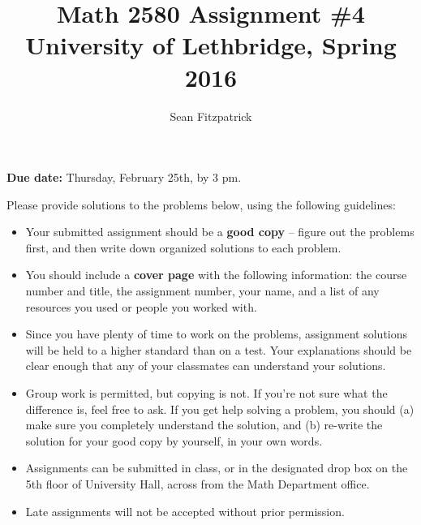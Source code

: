 \documentclass[letterpaper,12pt]{article}
\title{Math 2580 Assignment \#4\\University of Lethbridge, Spring 2016}
\author{Sean Fitzpatrick}
\begin{document}
 \maketitle

{\bf Due date:} Thursday, February 25th, by 3 pm.

\bigskip

Please provide solutions to the problems below, using the following guidelines:
\begin{itemize}
\item Your submitted assignment should be a {\bf good copy} -- figure out the problems first, and then write down organized solutions to each problem. 
\item You should include a {\bf cover page} with the following information: the course number and title, the assignment number, your name, and a list of any resources you used or people you worked with.
\item Since you have plenty of time to work on the problems, assignment solutions will be held to a higher standard than on a test. Your explanations should be clear enough that any of your classmates can understand your solutions.
\item Group work is permitted, but copying is not. If you're not sure what the difference is, feel free to ask. If you get help solving a problem, you should (a) make sure you completely understand the solution, and (b) re-write the solution for your good copy by yourself, in your own words.
\item Assignments can be submitted in class, or in the designated drop box on the 5th floor of University Hall, across from the Math Department office.
\item Late assignments will not be accepted without prior permission.

\end{itemize}
\newpage
\end{document}
